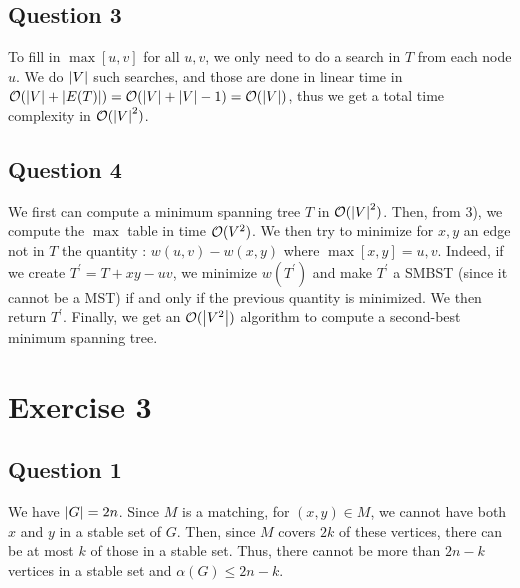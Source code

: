 \documentclass{cours}
\begin{document}
\subsection{Question 3}
To fill in $\max[u, v]$ for all $u, v$, we only need to do a search in $T$ from each node $u$. We do $\left|V\right|$ such searches, and those are done in linear time in $\mathcal{O}(\left|V\right| + \left|E(T)\right|) = \mathcal{O}(\left|V\right| + \left|V\right| - 1) = \mathcal{O}(\left|V\right|)$, thus we get a total time complexity in $\mathcal{O}(\left|V\right|^{2})$.

\subsection{Question 4}
We first can compute a minimum spanning tree $T$ in $\mathcal{O}(\left|V\right|^{2})$. Then, from 3), we compute the $\max$ table in time $\mathcal{O}(V^{2})$. We then try to minimize for $x, y$ an edge not in $T$ the quantity : $w\left(u, v\right) - w(x, y)$ where $\max[x, y] = u,v$. Indeed, if we create $T^{'} = T + xy - uv$, we minimize $w(T^{'})$ and make $T^{'}$ a SMBST (since it cannot be a MST) if and only if the previous quantity is minimized. We then return $T^{'}$. Finally, we get an $\mathcal{O}(\left|V^{2}\right|)$ algorithm to compute a second-best minimum spanning tree.

\newpage
\section{Exercise 3}
\subsection{Question 1}
We have $\left|G\right| = 2n$. Since $M$ is a matching, for $(x, y) \in M$, we cannot have both $x$ and $y$ in a stable set of $G$. Then, since $M$ covers $2k$ of these vertices, there can be at most $k$ of those in a stable set. Thus, there cannot be more than $2n - k$ vertices in a stable set and $\alpha(G) \leq 2n-k$.
\end{document}

